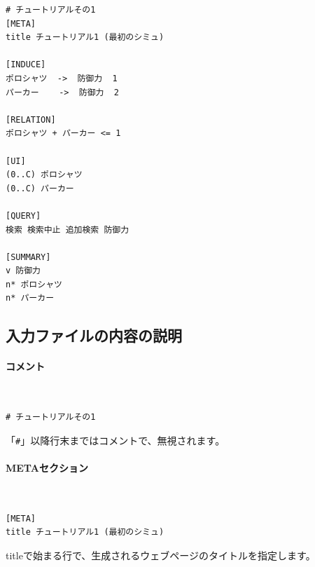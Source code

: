 \documentclass[dvipdfmx]{jsarticle}
\begin{document}
{\footnotesize\begin{mdframed}\begin{Verbatim}
# チュートリアルその1
[META]
title チュートリアル1 (最初のシミュ)

[INDUCE]
ポロシャツ  ->  防御力  1
パーカー    ->  防御力  2

[RELATION]
ポロシャツ + パーカー <= 1

[UI]
(0..C) ポロシャツ
(0..C) パーカー

[QUERY]
検索 検索中止 追加検索 防御力

[SUMMARY]
v 防御力
n* ポロシャツ
n* パーカー
\end{Verbatim}
\end{mdframed}}

\subsection{入力ファイルの内容の説明}

\paragraph{コメント}~\medskip
{\footnotesize\begin{mdframed}\begin{Verbatim}
# チュートリアルその1
\end{Verbatim}
\end{mdframed}}
\medskip

「\texttt{\#}」以降行末まではコメントで、無視されます。

\paragraph{METAセクション}~\medskip
{\footnotesize\begin{mdframed}\begin{Verbatim}
[META]
title チュートリアル1 (最初のシミュ)
\end{Verbatim}
\end{mdframed}}
\medskip

titleで始まる行で、生成されるウェブページのタイトルを指定します。

\begin{center}
\end{center}
\end{document}
